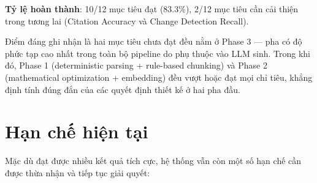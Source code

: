 \textbf{Tỷ lệ hoàn thành}: 10/12 mục tiêu đạt (83.3\%), 2/12 mục tiêu cần cải thiện trong tương lai (Citation Accuracy và Change Detection Recall).

Điểm đáng ghi nhận là hai mục tiêu chưa đạt đều nằm ở Phase 3 — pha có độ phức tạp cao nhất trong toàn bộ pipeline do phụ thuộc vào LLM sinh. Trong khi đó, Phase 1 (deterministic parsing + rule-based chunking) và Phase 2 (mathematical optimization + embedding) đều vượt hoặc đạt mọi chỉ tiêu, khẳng định tính đúng đắn của các quyết định thiết kế ở hai pha đầu.

\section{Hạn chế hiện tại}

Mặc dù đạt được nhiều kết quả tích cực, hệ thống vẫn còn một số hạn chế cần được thừa nhận và tiếp tục giải quyết:

